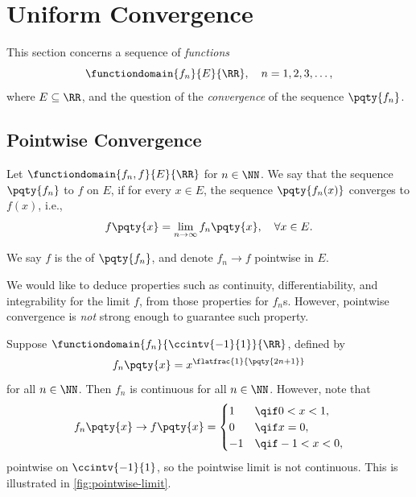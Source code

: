 \section{Uniform Convergence}

This section concerns a sequence of \emph{functions}
\[
    \functiondomain{f_n}{E}{\RR}, \quad n = 1, 2, 3, \ldots,
\]
where \(E \subseteq \RR\), and the question of the \emph{convergence} of the sequence \(\pqty{f_n}\).

\subsection{Pointwise Convergence}

\begin{definition}
    Let \(\functiondomain{f_n, f}{E}{\RR}\) for \(n \in \NN\). We say that the sequence \(\pqty{f_n}\)  to \(f\) on \(E\), if for every \(x \in E\), the sequence \(\pqty{f_n(x)}\) converges to \(f(x)\), i.e.,
    \[
        f\pqty{x} = \lim_{n \to \infty} f_n\pqty{x}, \quad \forall x \in E.
    \]
    
    We say \(f\) is the  of \(\pqty{f_n}\), and denote \(f_n \to f\) pointwise in \(E\).
\end{definition}

We would like to deduce properties such as continuity, differentiability, and integrability for the limit \(f\), from those properties for \(f_n\)s. However, pointwise convergence is \emph{not} strong enough to guarantee such property.

\begin{example}
    Suppose \(\functiondomain{f_n}{\ccintv{-1}{1}}{\RR}\), defined by
    \[
        f_n\pqty{x} = x^{\flatfrac{1}{\pqty{2n + 1}}}
    \]
    for all \(n \in \NN\). Then \(f_n\) is continuous for all \(n \in \NN\). However, note that
    \[
        f_n\pqty{x} \to f\pqty{x} = \begin{cases}
            1 & \qif 0 < x < 1, \\
            0 & \qif x = 0, \\
            -1 & \qif -1 < x < 0, \\
        \end{cases}
    \]
    pointwise on \(\ccintv{-1}{1}\), so the pointwise limit is not continuous. This is illustrated in \autoref{fig:pointwise-limit}.
\end{example}

